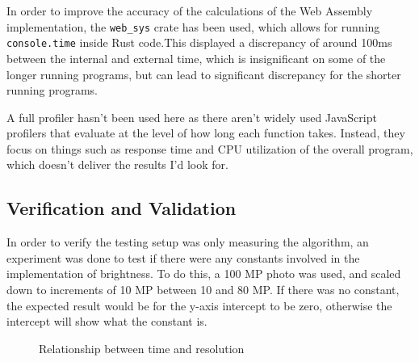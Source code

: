 \documentclass[12pt,a4paper]{article}
\begin{document}
In order to improve the accuracy of the calculations of the Web Assembly implementation, the \texttt{web\_sys} crate has been used, which allows for running \texttt{console.time} inside Rust code.This displayed a discrepancy of around 100ms between the internal and external time, which is insignificant on some of the longer running programs, but can lead to significant discrepancy for the shorter running programs.

A full profiler hasn't been used here as there aren't widely used JavaScript profilers that evaluate at the level of how long each function takes. Instead, they focus on things such as response time and CPU utilization of the overall program, which doesn't deliver the results I'd look for.

\subsection{Verification and Validation}

In order to verify the testing setup was only measuring the algorithm, an experiment was done to test if there were any constants involved in the implementation of brightness. To do this, a 100 MP photo was used, and scaled down to increments of 10 MP between 10 and 80 MP. If there was no constant, the expected result would be for the y-axis intercept to be zero, otherwise the intercept will show what the constant is.


\begin{figure}[H]
    \centering
    \caption{Relationship between time and resolution}

\end{figure}
\end{document}
